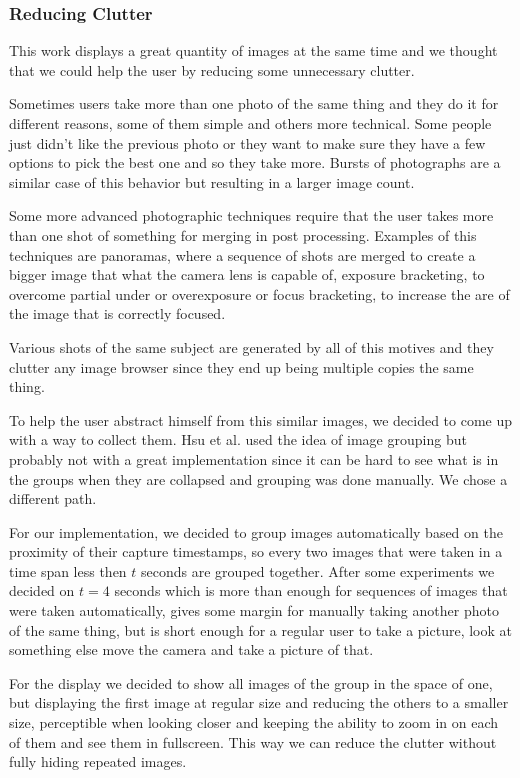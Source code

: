 \subsubsection{Reducing Clutter}
\label{ss:stacks}

This work displays a great quantity of images at the same time and we thought that we could help the user by reducing some unnecessary clutter.

Sometimes users take more than one photo of the same thing and they do it for different reasons, some of them simple and others more technical. Some people just didn't like the previous photo or they want to make sure they have a few options to pick the best one and so they take more. Bursts of photographs are a similar case of this behavior but resulting in a larger image count.

Some more advanced photographic techniques require that the user takes more than one shot of something for merging in post processing. Examples of this techniques are panoramas, where a sequence of shots are merged to create a bigger image that what the camera lens is capable of, exposure bracketing, to overcome partial under or overexposure or focus bracketing, to increase the are of the image that is correctly focused.

Various shots of the same subject are generated by all of this motives and they clutter any image browser since they end up being multiple copies the same thing.

To help the user abstract himself from this similar images, we decided to come up with a way to collect them. Hsu et al. \cite{Hsu:2009p2696} used the idea of image grouping but probably not with a great implementation since it can be hard to see what is in the groups when they are collapsed and grouping was done manually. We chose a different path.

For our implementation, we decided to group images automatically based on the proximity of their capture timestamps, so every two images that were taken in a time span less then $t$ seconds are grouped together. After some experiments we decided on $t=4$ seconds which is more than enough for sequences of images that were taken automatically, gives some margin for manually taking another photo of the same thing, but is short enough for a regular user to take a picture, look at something else move the camera and take a picture of that.

For the display we decided to show all images of the group in the space of one, but displaying the first image at regular size and reducing the others to a smaller size, perceptible when looking closer and keeping the ability to zoom in on each of them and see them in fullscreen. This way we can reduce the clutter without fully hiding repeated images.

